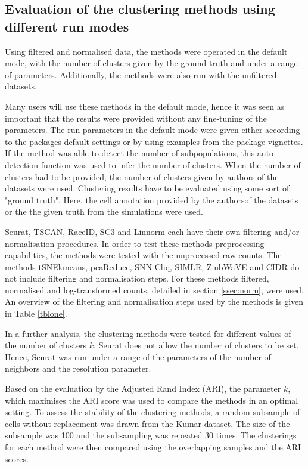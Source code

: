\documentclass[12pt, a4paper]{article}\usepackage[]{graphicx}\usepackage[]{color}
\begin{document}
\newpage
\subsection{Evaluation of the clustering methods using different run modes}
Using filtered and normalised data, the methods were operated in the default mode, with the number of clusters given by the ground truth and under a range of parameters. Additionally, the methods were also run with the unfiltered datasets. 

Many users will use these methods in the default mode, hence it was seen as important that the results were provided without any fine-tuning of the parameters.
The run parameters in the default mode were given either according to the packages default settings or by using examples from the package vignettes. If the method was able to detect the number of subpopulations, this auto-detection function was used to infer the number of clusters. When the number of clusters had to be provided, the number of clusters given by  authors of the datasets were used. Clustering results have to be evaluated using some sort of "ground truth". Here, the cell annotation provided by the authorsof the datasets or the the given truth from the simulations were used.

Seurat, TSCAN, RaceID, SC3 and Linnorm each have their own filtering and/or normalisation procedures. In order to test these methods preprocessing capabilities, the methods were tested with the unprocessed raw counts.
The methods tSNEkmeans, pcaReduce, SNN-Cliq, SIMLR, ZinbWaVE and CIDR do not include filtering and normalisation steps. For these methods filtered, normalised and log-transformed counts, detailed in section \ref{ssec:norm}, were used. An overview of the filtering and normalisation steps used by the methods is given in Table \ref{tblone}.

In a further analysis, the clustering methods were tested for different values of the number of clusters $k$. Seurat does not allow the number of clusters to be set. Hence, Seurat was run under a range of the parameters of the number of neighbors and the resolution parameter.

Based on the evaluation by the Adjusted Rand Index (ARI), the parameter $k$, which maximises the ARI score was used to compare the methods in an optimal setting. To assess the stability of the clustering methods, a random subsample of cells without replacement was drawn from the Kumar dataset. The size of the subsample was 100 and the subsampling was repeated 30 times. The clusterings for each method were then compared using the overlapping samples and the ARI scores.  
\end{document}
